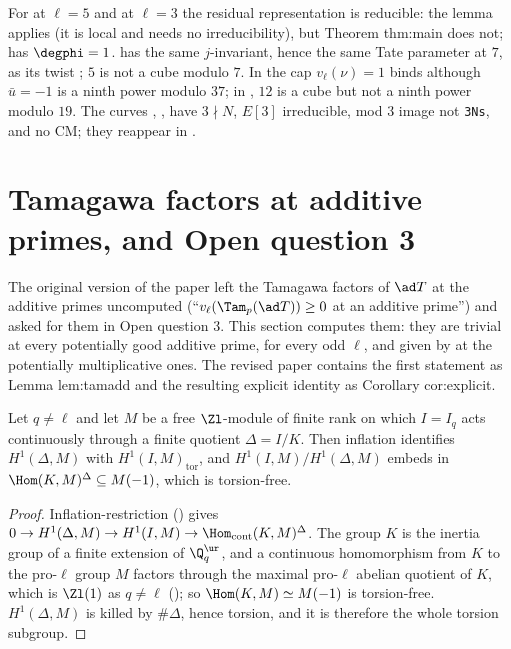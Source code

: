 \begin{example}
For  at $\ell=5$ and  at $\ell=3$ the residual representation is reducible: the lemma applies (it is local and needs no irreducibility), but Theorem
thm:main does not;  has $\degphi=1$.  has the same $j$-invariant, hence the same Tate parameter at $7$, as its twist ; $5$ is not a cube
modulo $7$. In  the cap $v_\ell(\nu)=1$ binds although $\bar u=-1$ is a ninth power modulo $37$; in , $12$ is a cube but not a ninth power modulo
$19$. The curves , ,  have $3\nmid N$, $E[3]$ irreducible, mod $3$ image not \texttt{3Ns}, and no CM; they reappear in
.
\end{example}

\section[Additive primes and Open question 3]{Tamagawa factors at additive primes, and Open question 3}\label{sec:blochkato:additive}

The original version of the paper left the Tamagawa factors of $\ad T$ at the additive primes uncomputed (``$v_\ell(\Tam_p(\ad T))\ge0$ at an additive prime'') and
asked for them in Open question 3. This section computes them: they are trivial at every potentially good additive prime, for every odd $\ell$, and given by
 at the potentially multiplicative ones. The revised paper contains the first statement as Lemma lem:tamadd and the resulting
explicit identity as Corollary cor:explicit.

\begin{lemma}\label{lem:blochkato:finite-inertia-image}
Let $q\ne\ell$ and let $M$ be a free $\Zl$-module of finite rank on which $I=I_q$ acts continuously through a finite quotient $\Delta=I/K$. Then inflation identifies
$H^1(\Delta,M)$ with $H^1(I,M)_{\mathrm{tor}}$, and $H^1(I,M)/H^1(\Delta,M)$ embeds in $\Hom(K,M)^\Delta\subseteq M(-1)$, which is torsion-free.
\end{lemma}

\begin{proof}
Inflation-restriction () gives $0\to H^1(\Delta,M)\to H^1(I,M)\to\Hom_{\mathrm{cont}}(K,M)^\Delta$. The group $K$ is the inertia group of a finite extension of $\Q_q^{\ur}$, and
a continuous homomorphism from $K$ to the pro-$\ell$ group $M$ factors through the maximal pro-$\ell$ abelian quotient of $K$, which is $\Zl(1)$ as $q\ne\ell$ (); so
$\Hom(K,M)\simeq M(-1)$ is torsion-free. $H^1(\Delta,M)$ is killed by $\#\Delta$, hence torsion, and it is therefore the whole torsion subgroup.
\end{proof}

